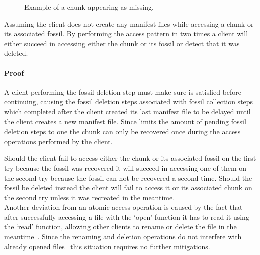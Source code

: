 \begin{figure}
    
    \caption{Example of a chunk appearing as missing.}\label{fig:nonatomic-access}
\end{figure}

\begin{samepage}
    \begin{thm}\label{thm:nonatomic-access}
        Assuming the client does not create any manifest files while accessing a
        chunk or its associated fossil.
        By performing the access pattern in  two times a client
        will either succeed in accessing either the chunk or its fossil or detect that
        it was deleted.
    \end{thm}
\end{samepage}

\paragraph{Proof} A client performing the fossil deletion step must make sure
 is satisfied before continuing, causing the fossil deletion
steps associated with fossil collection steps which completed after the client created
its last manifest file to be delayed until the client creates a new manifest file.
Since  limits the amount of pending fossil deletion steps
to one the chunk can only be recovered once during the access operations performed
by the client.

Should the client fail to access either the chunk or its associated fossil on
the first try because the fossil was recovered it will succeed in accessing one
of them on the second try because the fossil can not be recovered a second time.
Should the fossil be deleted instead the client will fail to access it or its
associated chunk on the second try unless it was recreated in the meantime. \\

Another deviation from an atomic access operation is caused by the fact that
after successfully accessing a file with the `open' function it
has to read it using the `read' function, allowing other clients to rename or
delete the file in the meantime~\cite{Posix}.
Since the renaming and deletion operations do not interfere with already opened
files~\cite[section `DESCRIPTION' of the `unlink' and `rename' functions]{Posix}
this situation requires no further mitigations.

